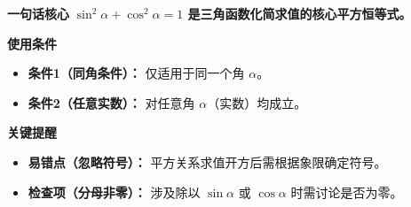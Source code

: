\begin{summarybox}
	\textbf{\textcolor{CSummary}{一句话核心}}
	\textbf{$\sin^2\alpha+\cos^2\alpha=1$ 是三角函数化简求值的核心平方恒等式。}

	\medskip
	\textbf{\textcolor{CSummary}{使用条件}}
	\begin{itemize}[leftmargin=*, itemsep=0.5em, topsep=0.4em]
		\item \textbf{条件1（同角条件）：} 仅适用于同一个角 $\alpha$。
		\item \textbf{条件2（任意实数）：} 对任意角 $\alpha$（实数）均成立。
	\end{itemize}

	\medskip
	\textbf{\textcolor{CSummary}{关键提醒}}
	\begin{itemize}[leftmargin=*, itemsep=0.5em, topsep=0.4em]
		\item \textbf{易错点（忽略符号）：} 平方关系求值开方后需根据象限确定符号。
		\item \textbf{检查项（分母非零）：} 涉及除以 $\sin\alpha$ 或 $\cos\alpha$ 时需讨论是否为零。
	\end{itemize}

\end{summarybox}
